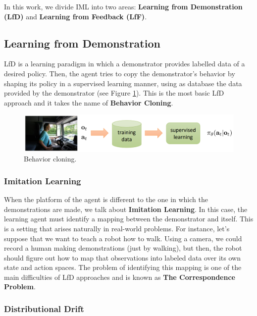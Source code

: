 In this work, we divide IML into two areas: \textbf{Learning from Demonstration (LfD)} and \textbf{Learning from Feedback (LfF)}. 

\subsection{Learning from Demonstration}

LfD is a learning paradigm in which a demonstrator provides labelled data of a desired policy. Then, the agent tries to copy the demonstrator's behavior by shaping its policy in a supervised learning manner, using as database the data provided by the demonstrator (see Figure \ref{fig:b_cloning}). This is the most basic LfD approach and it takes the name of \textbf{Behavior Cloning}.

\begin{figure}[h]
    \centering
    \includegraphics[width=0.9\linewidth]{imagenes/cap1/b_cloning.png}
    \caption{Behavior cloning.}
    \label{fig:b_cloning}
\end{figure}

\subsubsection{Imitation Learning}

When the platform of the agent is different to the one in which the demonstrations are made, we talk about \textbf{Imitation Learning}. In this case, the learning agent must identify a mapping between the demonstrator and itself. This is a setting that arises naturally in real-world problems. For instance, let's suppose that we want to teach a robot how to walk. Using a camera, we could record a human making demonstrations (just by walking), but then, the robot should figure out how to map that observations into labeled data over its own state and action spaces. The problem of identifying this mapping is one of the main difficulties of LfD approaches and is known as \textbf{The Correspondence Problem}.

\subsubsection{Distributional Drift}

